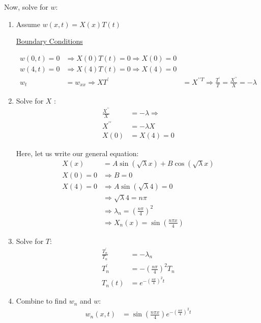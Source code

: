 Now, solve for $w$:
\begin{enumerate}
  \item Assume $w(x, t) = X(x)T(t)$

  \underline{Boundary Conditions}

  \begin{align}
    w(0, t) = 0 & \Rightarrow X(0)T(t) = 0 \Rightarrow X(0) = 0\\
    w(4, t) = 0 & \Rightarrow X(4)T(t) = 0 \Rightarrow X(4) = 0\\
    w_t & = w_{xx} \Rightarrow XT^\prime & = X^{\prime\prime T} \Rightarrow \frac{T^\prime}{T} = \frac{X^{\prime\prime}}{X} = - \lambda
  \end{align}

  \item Solve for $X$ :
  \begin{align}
    \frac{X^{\prime\prime}}{X} & = - \lambda \Rightarrow\\
    X^{\prime\prime} & = -\lambda X\\
    X(0) & = X(4) = 0
  \end{align}

  Here, let us write our general equation:
  \begin{align}
    X(x) & = A \sin(\sqrt \lambda x) + B \cos(\sqrt \lambda x)\\
    X(0) = 0 & \Rightarrow B = 0\\
    X(4) = 0 & \Rightarrow A \sin(\sqrt \lambda 4) = 0\\
    & \Rightarrow \sqrt \lambda 4 = n \pi\\
    & \Rightarrow \lambda_n = \left(\frac{n \pi}{4} \right)^2\\
    & \Rightarrow X_n(x) = \sin\left( \frac{n \pi x}{4} \right)
  \end{align}

  \item Solve for $T$:
  \begin{align}
    \frac{T^\prime_n}{T_n} & = -\lambda_n\\
    T^\prime_n & = -\left( \frac{n \pi}{4} \right)^2 T_n\\
    T_n(t) & = e^{- \left( \frac{n \pi}{4} \right)^2 t}
  \end{align}

  \item Combine to find $w_n$ and $w$:
  \begin{align}
    w_n(x, t) & = \sin\left(\frac{n \pi x}{4} \right)e^{-\left(\frac{n \pi}{4} \right)^2 t}
  \end{align}


\end{enumerate}
